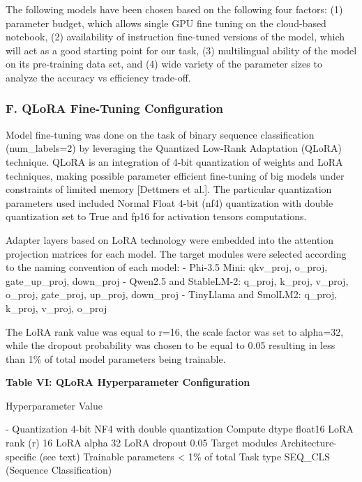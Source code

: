 The following models have been chosen based on the following four
factors: (1) parameter budget, which allows single GPU fine tuning on
the cloud-based notebook, (2) availability of instruction fine-tuned
versions of the model, which will act as a good starting point for our
task, (3) multilingual ability of the model on its pre-training data
set, and (4) wide variety of the parameter sizes to analyze the accuracy
vs efficiency trade-off.

\subsubsection{F. QLoRA Fine-Tuning
Configuration}\label{f.-qlora-fine-tuning-configuration}

Model fine-tuning was done on the task of binary sequence classification
(num\_labels=2) by leveraging the Quantized Low-Rank Adaptation (QLoRA)
technique. QLoRA is an integration of 4-bit quantization of weights and
LoRA techniques, making possible parameter efficient fine-tuning of big
models under constraints of limited memory {[}Dettmers et al.{]}. The
particular quantization parameters used included Normal Float 4-bit
(nf4) quantization with double quantization set to True and fp16 for
activation tensors computations.

Adapter layers based on LoRA technology were embedded into the attention
projection matrices for each model. The target modules were selected
according to the naming convention of each model: - Phi-3.5 Mini:
qkv\_proj, o\_proj, gate\_up\_proj, down\_proj - Qwen2.5 and StableLM-2:
q\_proj, k\_proj, v\_proj, o\_proj, gate\_proj, up\_proj, down\_proj -
TinyLlama and SmolLM2: q\_proj, k\_proj, v\_proj, o\_proj

The LoRA rank value was equal to r=16, the scale factor was set to
alpha=32, while the dropout probability was chosen to be equal to 0.05
resulting in less than 1\% of total model parameters being trainable.

\textbf{Table VI: QLoRA Hyperparameter Configuration}

Hyperparameter \textbar{} Value \textbar{}

\textbar\textbar-\textbar{} \textbar{} Quantization \textbar{} 4-bit NF4
with double quantization \textbar{} \textbar{} Compute dtype \textbar{}
float16 \textbar{} \textbar{} LoRA rank (r) \textbar{} 16 \textbar{}
\textbar{} LoRA alpha \textbar{} 32 \textbar{} \textbar{} LoRA dropout
\textbar{} 0.05 \textbar{} \textbar{} Target modules \textbar{}
Architecture-specific (see text) \textbar{} \textbar{} Trainable
parameters \textbar{} \textless{} 1\% of total \textbar{} \textbar{}
Task type \textbar{} SEQ\_CLS (Sequence Classification) \textbar{}

